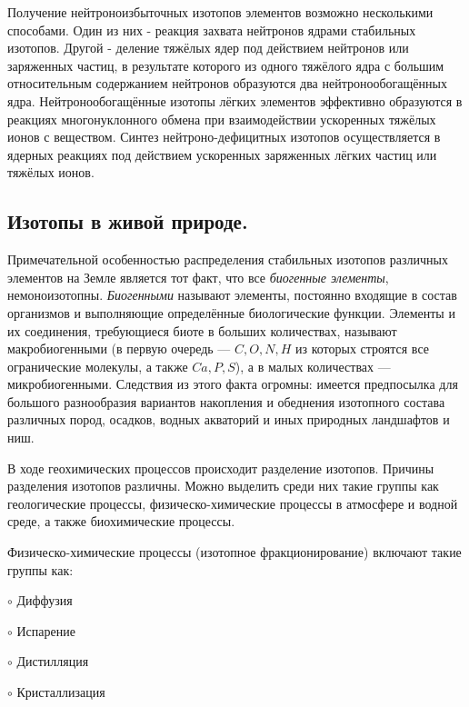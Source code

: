\documentclass[a5paper,openany]{book}
\begin{document}
Получение нейтроноизбыточных изотопов элементов возможно несколькими способами. Один из них -
реакция захвата нейтронов ядрами стабильных изотопов. Другой - деление тяжёлых ядер под действием
нейтронов или заряженных частиц, в результате которого из одного тяжёлого ядра с большим относительным
содержанием нейтронов образуются два нейтронообогащённых ядра. Нейтронообогащённые изотопы лёгких
элементов эффективно образуются в реакциях многонуклонного обмена при взаимодействии ускоренных
тяжёлых ионов с веществом. Синтез нейтроно-дефицитных изотопов осуществляется в ядерных реакциях под
действием ускоренных заряженных лёгких частиц или тяжёлых ионов.

\subsection{Изотопы в живой природе.}
Примечательной особенностью распределения стабильных изотопов различных элементов на Земле является тот факт, что все \emph{биогенные элементы}, немоноизотопны. \emph{Биогенными} называют элементы, постоянно входящие в состав организмов и выполняющие определённые биологические функции. Элементы и их соединения, требующиеся биоте в больших количествах, называют макробиогенными (в первую очередь --- $C, O, N, H$ из которых строятся все огранические молекулы, а также $Ca, P, S$), а в малых количествах --- микробиогенными.  
Следствия из этого факта огромны:
имеется предпосылка для большого разнообразия вариантов накопления и обеднения изотопного состава различных пород, осадков, водных акваторий и иных природных ландшафтов и ниш.

В ходе геохимических процессов происходит разделение изотопов.
Причины разделения изотопов различны. Можно выделить среди них такие группы как геологические процессы, физическо-химические процессы в атмосфере и водной среде, а также биохимические процессы.

Физическо-химические процессы (изотопное фракционирование) включают такие группы как:  
\begin{list}{}{\itemsep=0pt\itemindent=12pt\topsep=2pt\parsep=2pt} 
\label{fractioning}
	\item [$\circ$] Диффузия
\item  [$\circ$] Испарение 
\item  [$\circ$] Дистилляция  %
\item  [$\circ$] Кристаллизация 
\end{list} 
\end{document}
